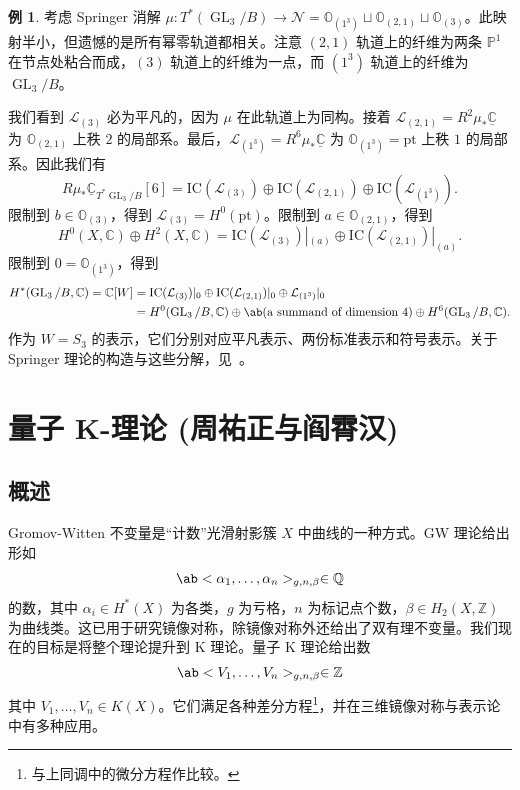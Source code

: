 \documentclass{amsart}
\theoremstyle{definition}
\newtheorem{exm}[thm]{例}
\theoremstyle{remark}
\theoremstyle{plain}
\theoremstyle{definition}
\theoremstyle{remark}
\newcommand{\C}{\mathbb{C}}
\newcommand{\Z}{\mathbb{Z}}
\newcommand{\Q}{\mathbb{Q}}
\renewcommand{\P}{\mathbb{P}}
\newcommand{\mc}[1]{\mathcal{#1}}
\newcommand{\mr}[1]{\mathrm{#1}}
\newcommand{\on}[1]{\operatorname{#1}}
\newcommand{\ul}[1]{\underline{#1}}
\newcommand{\1}{\mathbf{1}}
\newcommand{\2}{\mathbf{2}}
\newcommand{\3}{\mathbf{3}}
\begin{document}
\begin{exm}
    考虑 Springer 消解 \(\mu \colon T^*(\on{GL}_3/B) \to \mc{N} = \mathbb{O}_{(1^3)} \sqcup \mathbb{O}_{(2,1)} \sqcup \mathbb{O}_{(3)}\)。此映射半小，但遗憾的是所有幂零轨道都相关。注意 \((2,1)\) 轨道上的纤维为两条 \(\P^1\) 在节点处粘合而成，\((3)\) 轨道上的纤维为一点，而 \((1^3)\) 轨道上的纤维为 \(\on{GL}_3/B\)。

    我们看到 \(\mc{L}_{(3)}\) 必为平凡的，因为 \(\mu\) 在此轨道上为同构。接着 \(\mc{L}_{(2,1)} = R^2 \mu_* \ul{\C}\) 为 \(\mathbb{O}_{(2,1)}\) 上秩 \(2\) 的局部系。最后，\(\mc{L}_{(1^3)} = R^6 \mu_* \ul{\C}\) 为 \(\mathbb{O}_{(1^3)} = \mr{pt}\) 上秩 \(1\) 的局部系。因此我们有
    \[ R \mu_* \ul{\C}_{T^*\on{GL}_3/B}[6] = \mr{IC}(\mc{L}_{(3)}) \oplus \mr{IC}(\mc{L}_{(2,1)}) \oplus \mr{IC}(\mc{L}_{(1^3)}). \]
    限制到 \(b \in \mathbb{O}_{(3)}\)，得到 \(\mc{L}_{(3)} = H^0(\mr{pt})\)。限制到 \(a \in \mathbb{O}_{(2,1)}\)，得到
    \[ H^0(X, \C) \oplus H^2(X, \C) = \mr{IC}(\mc{L}_{(3)})|_{(a)} \oplus \mr{IC}(\mc{L}_{(2,1)})|_{(a)}. \]
    限制到 \(0 = \mathbb{O}_{(1^3)}\)，得到
    \begin{align*}
        H^*(\on{GL}_3/B, \C) = \C[W] &= \mr{IC}(\mc{L}_{(3)})|_0 \oplus \mr{IC}(\mc{L}_{(2,1)})|_0 \oplus \mc{L}_{(1^3)}|_0 \\
        &= H^0(\on{GL}_3/B, \C) \oplus \ab(\text{a summand of dimension } 4) \oplus H^6(\on{GL}_3/B, \C).
    \end{align*}
    作为 \(W = S_3\) 的表示，它们分别对应平凡表示、两份标准表示和符号表示。关于 Springer 理论的构造与这些分解，见~\cite{BorhoMacPherson1983}。
\end{exm}

\section{量子 K-理论 (周祐正与阎霄汉)}%
\label{sec:Quantum K-theory (Xiaohan Yan and You-Cheng Chou)}

\subsection{概述}%
\label{sub:Overview}

Gromov-Witten 不变量是“计数”光滑射影簇 \(X\) 中曲线的一种方式。GW 理论给出形如
\[ \ab<\alpha_1, \ldots, \alpha_n>_{g, n, \beta} \in \Q \]
的数，其中 \(\alpha_i \in H^*(X)\) 为各类，\(g\) 为亏格，\(n\) 为标记点个数，\(\beta \in H_2(X, \Z)\) 为曲线类。这已用于研究镜像对称，除镜像对称外还给出了双有理不变量。我们现在的目标是将整个理论提升到 K 理论。量子 K 理论给出数
\[ \ab<V_1, \ldots, V_n>_{g, n, \beta} \in \Z \]
其中 \(V_1, \ldots, V_n \in K(X)\)。它们满足各种差分方程\footnote{与上同调中的微分方程作比较。}，并在三维镜像对称与表示论中有多种应用。
\end{document}
